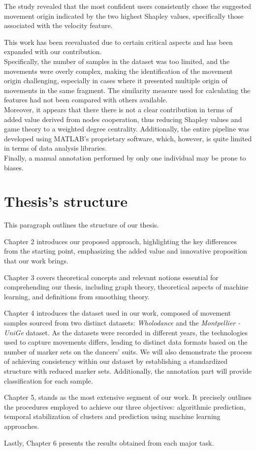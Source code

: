 The study revealed that the most confident users consistently chose the suggested movement origin indicated by the two highest Shapley values, specifically those associated with the velocity feature.

This work has been reevaluated due to certain critical aspects and has been expanded with our contribution.\\
Specifically, the number of samples in the dataset was too limited, and the movements were overly complex, making the identification of the movement origin challenging, especially in cases where it presented multiple origin of movements in the same fragment.
The similarity measure used for calculating the features had not been compared with others available. \\
Moreover, it appears that there there is not a clear contribution in terms of added value derived from nodes cooperation, thus reducing Shapley values and game theory to a weighted degree centrality.
Additionally, the entire pipeline was developed using MATLAB's proprietary software, which, however, is quite limited in terms of data analysis libraries.\\
Finally, a manual annotation performed by only one individual may be prone to biases.


\section{Thesis's structure}
This paragraph outlines the structure of our thesis. 

Chapter 2 introduces our proposed approach, highlighting the key differences from the starting point, emphasizing the added value and innovative proposition that our work brings. 

Chapter 3 covers theoretical concepts and relevant notions essential for comprehending our thesis, including graph theory, theoretical aspects of machine learning, and definitions from smoothing theory. 

Chapter 4 introduces the dataset used in our work, composed of movement samples sourced from two distinct datasets: \textit{Wholodance} and the \textit{Montpellier - UniGe} dataset.
As the datasets were recorded in different years, the technologies used to capture movements differs, leading to distinct data formats based on the number of marker sets on the dancers' suits.
We will also demonstrate the process of achieving consistency within our dataset by establishing a standardized structure with reduced marker sets.
Additionally, the annotation part will provide classification for each sample. 

Chapter 5, stands as the most extensive segment of our work.
It precisely outlines the procedures employed to achieve our three objectives: algorithmic prediction, temporal stabilization of clusters and prediction using machine learning approaches.

Lastly, Chapter 6 presents the results obtained from each major task.